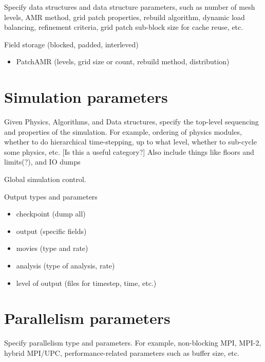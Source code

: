 \documentclass{book}
\begin{document}
Specify data structures and data structure parameters, such as number
of mesh levels, AMR method, grid patch properties, rebuild algorithm,
dynamic load balancing, refinement criteria, grid patch sub-block size
for cache reuse, etc.

Field storage (blocked, padded, interleved)

\begin{itemize}
\item PatchAMR (levels, grid size or count, rebuild method, distribution)
\end{itemize}

\section{Simulation parameters} \label{s:simulation}

Given Physics, Algorithms, and Data structures, specify the top-level
sequencing and properties of the simulation.  For example, ordering of
physics modules, whether to do hierarchical time-stepping, up to what
level, whether to sub-cycle some physics, etc. [Is this a useful
category?]  Also include things like floors and limits(?), and IO
dumps

Global simulation control.

Output types and parameters

\begin{itemize}
\item checkpoint (dump all)
\item output (specific fields)
\item movies (type and rate)
\item analysis (type of analysis, rate)
\item level of output (files for timestep, time, etc.)
\end{itemize}

\section{Parallelism parameters} \label{s:parallel}

Specify parallelism type and parameters.  For example, non-blocking
MPI, MPI-2, hybrid MPI/UPC, performance-related parameters such as
buffer size, etc.
\end{document}
